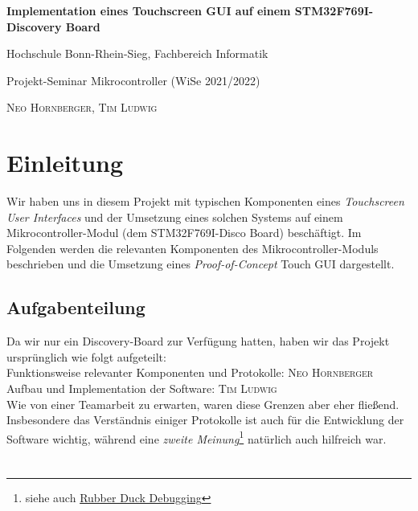 \documentclass[a4paper,singleside,12pt,titlepage]{scrartcl}
\newcommand{\linkstyle}[1]{\color{blue}#1}
\newcommand{\link}[2]{\href{#1}{\linkstyle{#2}}}
\begin{document}
	    \begin{titlepage}
		
		\hspace*{0pt}
		\vfill
		\begin{center}
			{\Huge\textbf{Implementation eines Touchscreen GUI auf einem STM32F769I-Discovery Board}}\par
			\bigskip
			\bigskip
			{\large Hochschule Bonn-Rhein-Sieg, Fachbereich Informatik}\par
			{\large Projekt-Seminar Mikrocontroller (WiSe 2021/2022)}\par
			\bigskip
			\bigskip
			\bigskip
			\bigskip
			\bigskip
			\textsc{Neo Hornberger, Tim Ludwig}\par
		\end{center}
		\vfill
		\hspace*{0pt}
	\end{titlepage}

	\tableofcontents
	\listoffigures
	\newpage
	
	\section{Einleitung}
		Wir haben uns in diesem Projekt mit typischen Komponenten eines \emph{Touchscreen User Interfaces}
		und der Umsetzung eines solchen Systems auf einem Mikrocontroller-Modul (dem STM32F769I-Disco Board) beschäftigt.
		Im Folgenden werden die relevanten Komponenten des Mikrocontroller-Moduls beschrieben
		und die Umsetzung eines \emph{Proof-of-Concept} Touch GUI dargestellt.
		
		\subsection{Aufgabenteilung}
			Da wir nur ein Discovery-Board zur Verfügung hatten, haben wir das Projekt ursprünglich wie folgt aufgeteilt:\\
			Funktionsweise relevanter Komponenten und Protokolle: \textsc{Neo Hornberger}\\
			Aufbau und Implementation der Software: \textsc{Tim Ludwig}\\
			Wie von einer Teamarbeit zu erwarten, waren diese Grenzen aber eher fließend.
			Insbesondere das Verständnis einiger Protokolle ist auch für die Entwicklung der Software wichtig,
			während eine \emph{zweite Meinung}\footnote{siehe auch  \link{https://rubberduckdebugging.com/}{Rubber Duck Debugging}}
			natürlich auch hilfreich war.
	
	\section{}
	
	
	
	
	
	\newpage
	\printbibliography[heading=bibnumbered]
\end{document}
